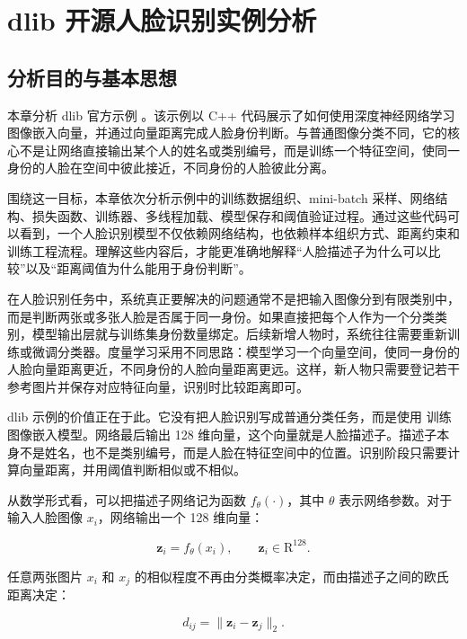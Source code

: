 \section{dlib 开源人脸识别实例分析}

\subsection{分析目的与基本思想}

本章分析 dlib 官方示例 。该示例以 C++ 代码展示了如何使用深度神经网络学习图像嵌入向量，并通过向量距离完成人脸身份判断。与普通图像分类不同，它的核心不是让网络直接输出某个人的姓名或类别编号，而是训练一个特征空间，使同一身份的人脸在空间中彼此接近，不同身份的人脸彼此分离。

围绕这一目标，本章依次分析示例中的训练数据组织、mini-batch 采样、网络结构、损失函数、训练器、多线程加载、模型保存和阈值验证过程。通过这些代码可以看到，一个人脸识别模型不仅依赖网络结构，也依赖样本组织方式、距离约束和训练工程流程。理解这些内容后，才能更准确地解释“人脸描述子为什么可以比较”以及“距离阈值为什么能用于身份判断”。

在人脸识别任务中，系统真正要解决的问题通常不是把输入图像分到有限类别中，而是判断两张或多张人脸是否属于同一身份。如果直接把每个人作为一个分类类别，模型输出层就与训练集身份数量绑定。后续新增人物时，系统往往需要重新训练或微调分类器。度量学习采用不同思路：模型学习一个向量空间，使同一身份的人脸向量距离更近，不同身份的人脸向量距离更远。这样，新人物只需要登记若干参考图片并保存对应特征向量，识别时比较距离即可。

dlib 示例的价值正在于此。它没有把人脸识别写成普通分类任务，而是使用  训练图像嵌入模型。网络最后输出 128 维向量，这个向量就是人脸描述子。描述子本身不是姓名，也不是类别编号，而是人脸在特征空间中的位置。识别阶段只需要计算向量距离，并用阈值判断相似或不相似。

从数学形式看，可以把描述子网络记为函数 $f_\theta(\cdot)$，其中 $\theta$ 表示网络参数。对于输入人脸图像 $x_i$，网络输出一个 128 维向量：

\begin{equation}
  \mathbf{z}_i = f_\theta(x_i), \qquad \mathbf{z}_i \in \mathrm{R}^{128}.
  \label{eq:face_descriptor}
\end{equation}

任意两张图片 $x_i$ 和 $x_j$ 的相似程度不再由分类概率决定，而由描述子之间的欧氏距离决定：

\begin{equation}
  d_{ij} = \lVert \mathbf{z}_i - \mathbf{z}_j \rVert_2.
  \label{eq:descriptor_distance}
\end{equation}


